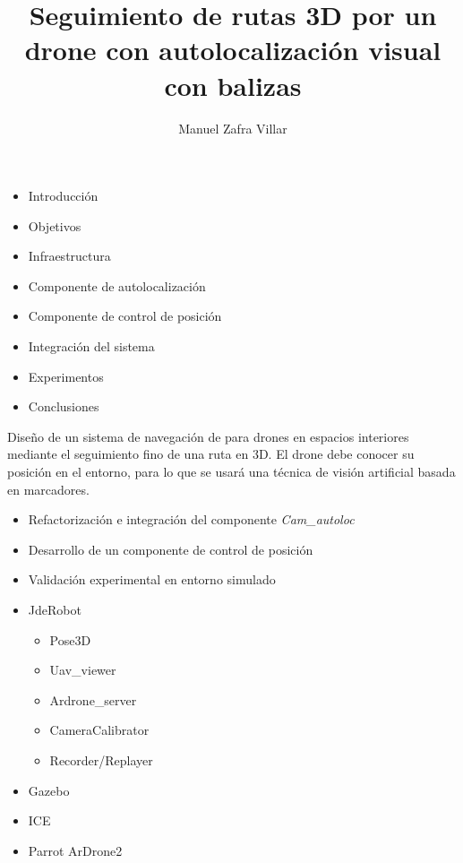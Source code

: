 \documentclass[notes,slidesec,a4]{seminar}
\title{Seguimiento de rutas 3D por un drone con autolocalización
visual con balizas}
\author{Manuel Zafra Villar}
\begin{document}
\maketitle


\begin{hslide}
\begin{itemize}
\item Introducción
\item Objetivos
\item Infraestructura
\item Componente de autolocalización
\item Componente de control de posición
\item Integración del sistema
\item Experimentos
\item Conclusiones
\end{itemize}
\end{hslide}



\begin{hslide}
\end{hslide}



\begin{hslide}


Diseño de un sistema de navegación de para drones en espacios interiores mediante el seguimiento fino de una ruta en 3D. El drone debe conocer su posición en el entorno, para lo que se usará una técnica de visión artificial basada en marcadores.


\begin{itemize}
\item Refactorización e integración del componente \textit{Cam\_autoloc}
\item Desarrollo de un componente de control de posición
\item Validación experimental en entorno simulado
\end{itemize}

\end{hslide}



\begin{hslide}

\begin{itemize}
\item JdeRobot
	\begin{itemize}
	\item Pose3D
	\item Uav\_viewer
	\item Ardrone\_server
	\item CameraCalibrator
	\item Recorder/Replayer
	\end{itemize}
\item Gazebo
\item ICE
\item Parrot ArDrone2
\end{itemize}

\end{hslide}
\end{document}

